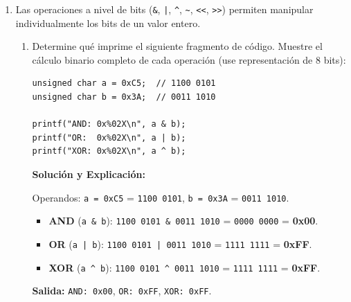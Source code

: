 \documentclass[11pt,letterpaper]{article}
\begin{document}
\begin{enumerate}[label=\textbf{\arabic*.}]
    \newpage
    \item Las operaciones a nivel de bits (\texttt{\&}, \texttt{|}, \texttt{\^{}}, \texttt{\~{}}, \texttt{<<}, \texttt{>>}) permiten manipular individualmente los bits de un valor entero.

    \begin{enumerate}[label=(\alph*)]
        \item Determine qué imprime el siguiente fragmento de código. Muestre el cálculo binario completo de cada operación (use representación de 8 bits):
        \begin{lstlisting}[style=customc]
unsigned char a = 0xC5;  // 1100 0101
unsigned char b = 0x3A;  // 0011 1010

printf("AND: 0x%02X\n", a & b);
printf("OR:  0x%02X\n", a | b);
printf("XOR: 0x%02X\n", a ^ b);
        \end{lstlisting}

        \begin{solucionbox}
        \textbf{Solución y Explicación:}

        \noindent Operandos: \texttt{a = 0xC5} = \texttt{1100 0101}, \texttt{b = 0x3A} = \texttt{0011 1010}.
        \begin{itemize}[noitemsep]
            \item \textbf{AND} (\texttt{a \& b}): \texttt{1100 0101 \& 0011 1010} = \texttt{0000 0000} = \textbf{0x00}.
            \item \textbf{OR} (\texttt{a | b}): \texttt{1100 0101 | 0011 1010} = \texttt{1111 1111} = \textbf{0xFF}.
            \item \textbf{XOR} (\texttt{a \^{} b}): \texttt{1100 0101 \^{} 0011 1010} = \texttt{1111 1111} = \textbf{0xFF}.
        \end{itemize}
        \noindent \textbf{Salida:} \texttt{AND: 0x00}, \texttt{OR: 0xFF}, \texttt{XOR: 0xFF}.
        \end{solucionbox}


\end{enumerate}
\end{enumerate}
\end{document}
